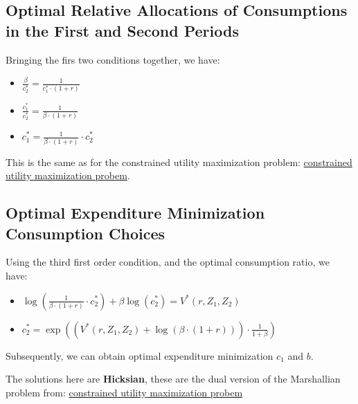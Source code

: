 \documentclass[
]{book}
\begin{document}
\hypertarget{optimal-relative-allocations-of-consumptions-in-the-first-and-second-periods-1}{%
\subsection{Optimal Relative Allocations of Consumptions in the First and Second Periods}\label{optimal-relative-allocations-of-consumptions-in-the-first-and-second-periods-1}}

Bringing the firs two conditions together, we have:

\begin{itemize}
\item
  \(\displaystyle \frac{\beta }{c_2^{\ast } }=\frac{1}{c_1^{\ast } \cdot (1+r)}\)
\item
  \(\displaystyle \frac{c_1^{\ast } }{c_2^{\ast } }=\frac{1}{\beta \cdot (1+r)}\)
\item
  \(\displaystyle c_1^{\ast } =\frac{1}{\beta \cdot (1+r)}\cdot c_2^{\ast }\)
\end{itemize}

This is the same as for the constrained utility maximization problem:
\href{https://math4econ.github.io/opti_hh_constrained_brsv/household_c1_c2_constrained.html}{constrained utility maximization
probem}.

\hypertarget{optimal-expenditure-minimization-consumption-choices}{%
\subsection{Optimal Expenditure Minimization Consumption Choices}\label{optimal-expenditure-minimization-consumption-choices}}

Using the third first order condition, and the optimal consumption
ratio, we have:

\begin{itemize}
\item
  \(\displaystyle \log (\frac{1}{\beta \cdot (1+r)}\cdot c_2^{\ast } )+\beta \log (c_2^{\ast } )=V^{\ast } (r,Z_1 ,Z_2 )\)
\item
  \(\displaystyle c_2^{\ast } =\exp \left(\left(V^{\ast } (r,Z_1 ,Z_2 )+\log (\beta \cdot (1+r))\right)\cdot \frac{1}{1+\beta }\right)\)
\end{itemize}

Subsequently, we can obtain optimal expenditure minimization \(c_1\) and
\(b\).

The solutions here are \textbf{Hicksian}, these are the dual version of the
Marshallian problem from: \href{https://math4econ.github.io/opti_hh_constrained_brsv/household_c1_c2_constrained.html}{constrained utility maximization
probem}
\end{document}
